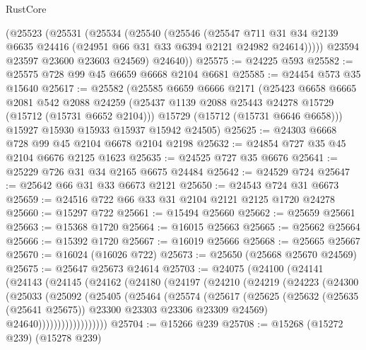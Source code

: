 \begin{lexlean}{RustCore}
\begin{coremodule}
      (@25523
        (@25531
          (@25534
            (@25540
              (@25546
                (@25547
                  @711
                  @31
                  @34
                  @2139
                  @6635
                  @24416
                  (@24951 @66 @31 @33 @6394 @2121 @24982 @24614)))))
          @23594
          @23597
          @23600
          @23603
          @24569)
        @24640))
@25575 := @24225 @593
@25582 := @25575 @728 @99 @45 @6659 @6668 @2104 @6681
@25585 := @24454 @573 @35 @15640
@25617 := @25582
    (@25585
      @6659
      @6666
      @2171
      (@25423
        @6658
        @6665
        @2081
        @542
        @2088
        @24259
        (@25437 @1139 @2088 @25443 @24278 @15729 (@15712 (@15731 @6652 @2104)))
        @15729
        (@15712 (@15731 @6646 @6658)))
      @15927
      @15930
      @15933
      @15937
      @15942
      @24505)
@25625 := @24303 @6668 @728 @99 @45 @2104 @6678 @2104 @2198
@25632 := @24854 @727 @35 @45 @2104 @6676 @2125 @1623
@25635 := @24525 @727 @35 @6676
@25641 := @25229 @726 @31 @34 @2165 @6675 @24484
@25642 := @24529 @724
@25647 := @25642 @66 @31 @33 @6673 @2121
@25650 := @24543 @724 @31 @6673
@25659 := @24516 @722 @66 @33 @31 @2104 @2121 @2125 @1720 @24278
@25660 := @15297 @722
@25661 := @15494 @25660
@25662 := @25659 @25661
@25663 := @15368 @1720
@25664 := @16015 @25663
@25665 := @25662 @25664
@25666 := @15392 @1720
@25667 := @16019 @25666
@25668 := @25665 @25667
@25670 := @16024 (@16026 @722)
@25673 := @25650 (@25668 @25670 @24569)
@25675 := @25647 @25673 @24614
@25703 := @24075
    (@24100
      (@24141
        (@24143
          (@24145
            (@24162
              (@24180
                (@24197
                  (@24210
                    (@24219
                      (@24223
                        (@24300
                          (@25033
                            (@25092
                              (@25405
                                (@25464
                                  (@25574
                                    (@25617
                                      (@25625
                                        (@25632
                                          (@25635 (@25641 @25675))
                                          @23300
                                          @23303
                                          @23306
                                          @23309
                                          @24569)
                                        @24640))))))))))))))))))
@25704 := @15266 @239
@25708 := @15268 (@15272 @239) (@15278 @239)

\end{coremodule}
\end{lexlean}
